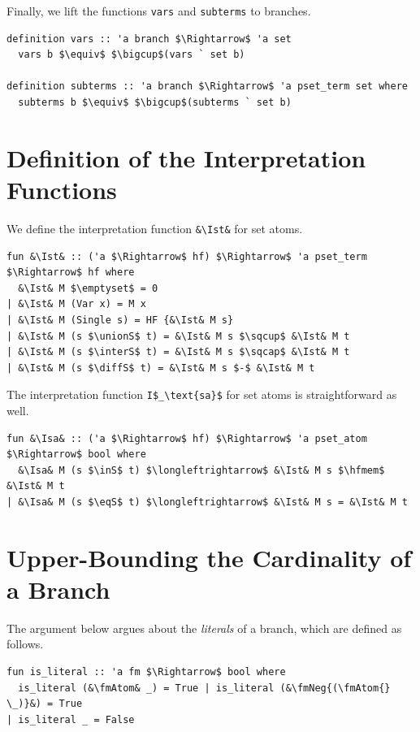 \documentclass[runningheads]{llncs}
\newcommand{\unionS}{\sqcup_\text{s}}
\newcommand{\interS}{\sqcap_\text{s}}
\newcommand{\diffS}{-_\text{s}}
\newcommand{\inS}{\in_\text{s}}
\newcommand{\eqS}{=_\text{s}}
\newcommand{\Ist}{I$_\text{st}$}
\newcommand{\Isa}{I$_\text{sa}$}
\newcommand{\hfmem}{\boldsymbol{\in}}
\newcommand{\fmNegSymbol}{\boldsymbol{\neg}}
\newcommand{\fmNeg}[1]{$\fmNegSymbol\:$#1}
\newcommand{\fmAtom}{\textbf{A}}
\begin{document}
Finally, we lift the functions \lstinline!vars! and \lstinline!subterms! to branches.
\begin{lstlisting}
definition vars :: 'a branch $\Rightarrow$ 'a set 
  vars b $\equiv$ $\bigcup$(vars ` set b)

definition subterms :: 'a branch $\Rightarrow$ 'a pset_term set where
  subterms b $\equiv$ $\bigcup$(subterms ` set b)
\end{lstlisting}

\clearpage

\section{Definition of the Interpretation Functions\label{appendix:semantics}}

We define the interpretation function \lstinline!&\Ist&! for set atoms.
\begin{lstlisting}
fun &\Ist& :: ('a $\Rightarrow$ hf) $\Rightarrow$ 'a pset_term $\Rightarrow$ hf where
  &\Ist& M $\emptyset$ = 0
| &\Ist& M (Var x) = M x
| &\Ist& M (Single s) = HF {&\Ist& M s}
| &\Ist& M (s $\unionS$ t) = &\Ist& M s $\sqcup$ &\Ist& M t 
| &\Ist& M (s $\interS$ t) = &\Ist& M s $\sqcap$ &\Ist& M t 
| &\Ist& M (s $\diffS$ t) = &\Ist& M s $-$ &\Ist& M t 
\end{lstlisting}
The interpretation function \lstinline!I$_\text{sa}$! for set atoms is straightforward as well.
\begin{lstlisting}
fun &\Isa& :: ('a $\Rightarrow$ hf) $\Rightarrow$ 'a pset_atom $\Rightarrow$ bool where
  &\Isa& M (s $\inS$ t) $\longleftrightarrow$ &\Ist& M s $\hfmem$ &\Ist& M t
| &\Isa& M (s $\eqS$ t) $\longleftrightarrow$ &\Ist& M s = &\Ist& M t
\end{lstlisting}

\section{Upper-Bounding the Cardinality of a Branch\label{appendix:bound}}
The argument below argues about the \emph{literals} of a branch, which are defined as follows.
\begin{lstlisting}
fun is_literal :: 'a fm $\Rightarrow$ bool where
  is_literal (&\fmAtom& _) = True | is_literal (&\fmNeg{(\fmAtom{} \_)}&) = True
| is_literal _ = False
\end{lstlisting}
\end{document}
